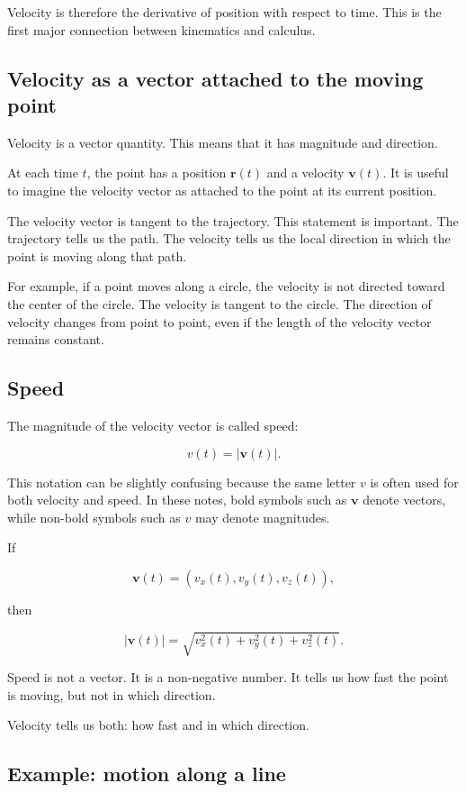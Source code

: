 Velocity is therefore the derivative of position with respect to time. This is the first major connection between kinematics and calculus.

\subsection{Velocity as a vector attached to the moving point}

Velocity is a vector quantity. This means that it has magnitude and direction.

At each time \(t\), the point has a position \(\mathbf{r}(t)\) and a velocity \(\mathbf{v}(t)\). It is useful to imagine the velocity vector as attached to the point at its current position.

The velocity vector is tangent to the trajectory. This statement is important. The trajectory tells us the path. The velocity tells us the local direction in which the point is moving along that path.

For example, if a point moves along a circle, the velocity is not directed toward the center of the circle. The velocity is tangent to the circle. The direction of velocity changes from point to point, even if the length of the velocity vector remains constant.

\subsection{Speed}

The magnitude of the velocity vector is called speed:

\[
v(t)=|\mathbf{v}(t)|.
\]

This notation can be slightly confusing because the same letter \(v\) is often used for both velocity and speed. In these notes, bold symbols such as \(\mathbf{v}\) denote vectors, while non-bold symbols such as \(v\) may denote magnitudes.

If

\[
\mathbf{v}(t)=(v_x(t),v_y(t),v_z(t)),
\]

then

\[
|\mathbf{v}(t)|
=
\sqrt{v_x^2(t)+v_y^2(t)+v_z^2(t)}.
\]

Speed is not a vector. It is a non-negative number. It tells us how fast the point is moving, but not in which direction.

Velocity tells us both: how fast and in which direction.

\subsection{Example: motion along a line}

